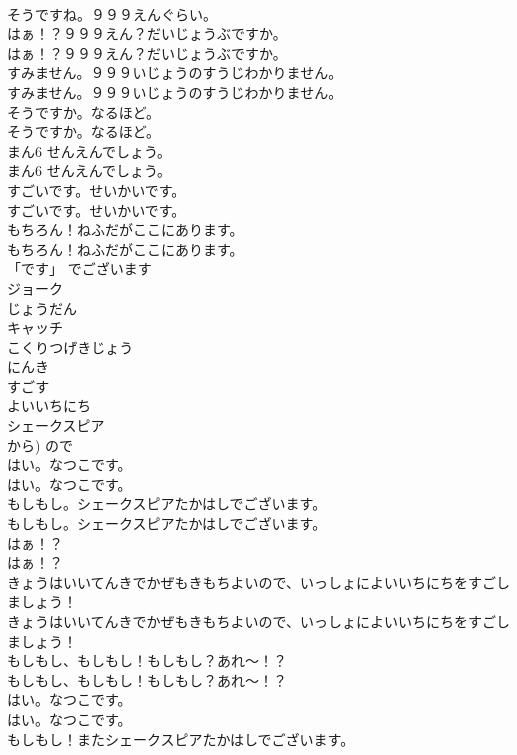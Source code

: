 \documentclass[8pt]{extreport}
\begin{document}
\begin{CJK}{UTF8}{min}
\\	そうですね。９９９えんぐらい。 
\\	はぁ！？９９９えん？だいじょうぶですか。	
\\	はぁ！？９９９えん？だいじょうぶですか。 
\\	すみません。９９９いじょうのすうじわかりません。	
\\	すみません。９９９いじょうのすうじわかりません。 
\\	そうですか。なるほど。	
\\	そうですか。なるほど。 
\\	まん6 せんえんでしょう。	
\\	まん6 せんえんでしょう。 
\\	すごいです。せいかいです。	
\\	すごいです。せいかいです。 
\\	もちろん！ねふだがここにあります。	
\\	もちろん！ねふだがここにあります。 
\\	「です」	でございます
\\	ジョーク
\\	じょうだん
\\	キャッチ
\\	こくりつげきじょう
\\	にんき
\\	すごす
\\	よいいちにち
\\	シェークスピア
\\	から)	ので
\\	はい。なつこです。	
\\	はい。なつこです。 
\\	もしもし。シェークスピアたかはしでございます。	
\\	もしもし。シェークスピアたかはしでございます。 
\\	はぁ！？	
\\	はぁ！？ 
\\	きょうはいいてんきでかぜもきもちよいので、いっしょによいいちにちをすごしましょう！	
\\	きょうはいいてんきでかぜもきもちよいので、いっしょによいいちにちをすごしましょう！ 
\\	もしもし、もしもし！もしもし？あれ～！？	
\\	もしもし、もしもし！もしもし？あれ～！？ 
\\	はい。なつこです。	
\\	はい。なつこです。 
\\	もしもし！またシェークスピアたかはしでございます。	

\end{CJK}
\end{document}
